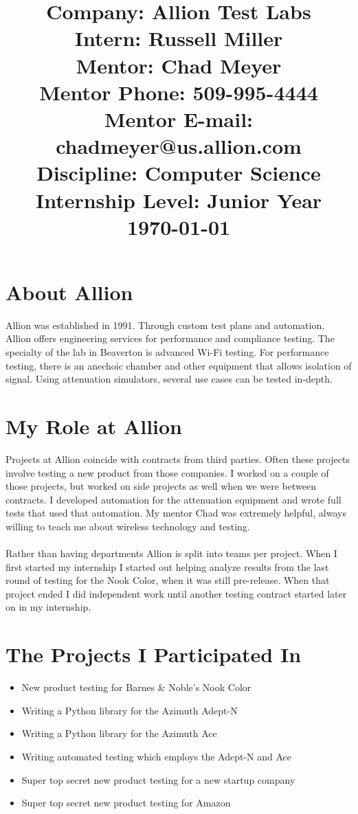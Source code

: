 \documentclass{article}
\title{Company: Allion Test Labs\\
Intern: Russell Miller\\
Mentor: Chad Meyer\\
Mentor Phone: 509-995-4444\\
Mentor E-mail: chadmeyer@us.allion.com\\
Discipline: Computer Science\\
Internship Level: Junior Year\\
\today}
\date{}
\begin{document}
\maketitle

\pagebreak

\section*{About Allion}
Allion was established in 1991. Through custom test plans and automation, Allion
offers engineering services for performance and compliance testing. 
The specialty of the lab in Beaverton is advanced Wi-Fi testing. For performance
testing, there is an anechoic chamber and other equipment that allows isolation
of signal. Using attenuation simulators, several use cases can be tested 
in-depth.

\section*{My Role at Allion}
Projects at Allion coincide with contracts from third parties. Often these
projects involve testing a new product from those companies. I worked on a
couple of those projects, but worked on side projects as well when we were
between contracts. I developed automation for the attenuation equipment and
wrote full tests that used that automation. My mentor Chad was extremely 
helpful, always willing to teach me about wireless technology and testing.\\
\\
Rather than having departments Allion is split into teams per project. When I
first started my internship I started out helping analyze results from the last 
round of testing for the Nook Color, when it was still pre-release. When that
project ended I did independent work until another testing contract started
later on in my internship.

\section*{The Projects I Participated In}
\begin{itemize}
\item New product testing for Barnes \& Noble's Nook Color
\item Writing a Python library for the Azimuth Adept-N
\item Writing a Python library for the Azimuth Ace
\item Writing automated testing which employs the Adept-N and Ace
\item Super top secret new product testing for a new startup company
\item Super top secret new product testing for Amazon
\end{itemize}
\end{document}
